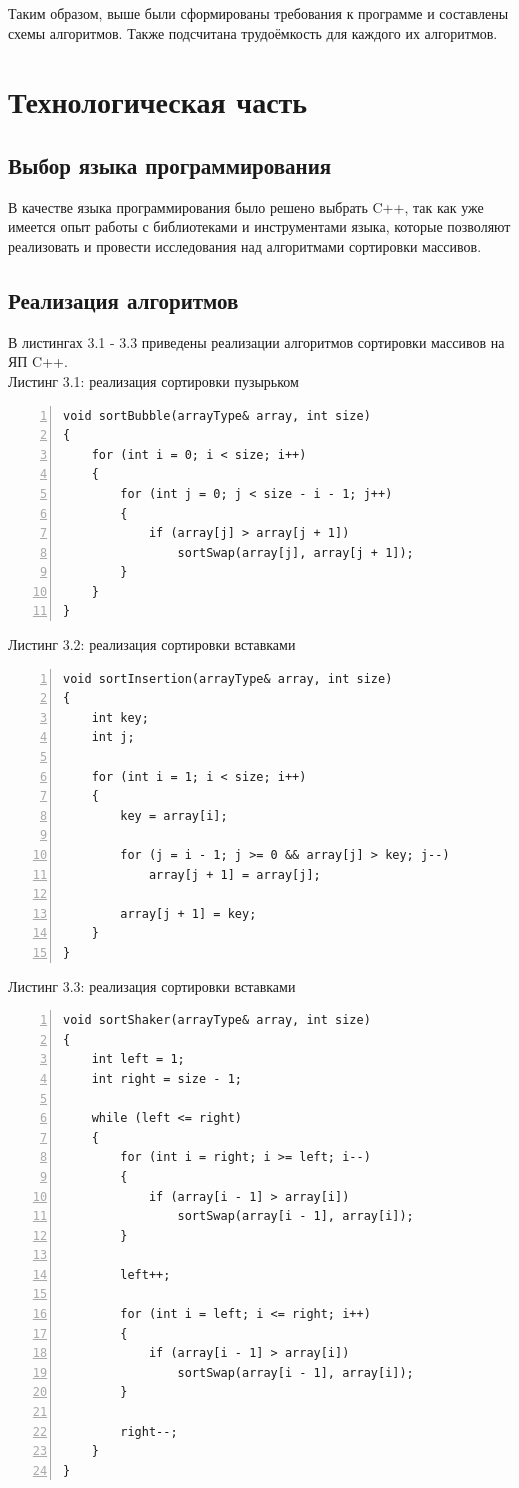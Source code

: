 \documentclass[12pt,a4paper]{report}
\begin{document}
Таким образом, выше были сформированы требования к программе и составлены схемы алгоритмов.
Также подсчитана трудоёмкость для каждого их алгоритмов.

\newpage
\chapter{Технологическая часть}

\section{Выбор языка программирования}

В качестве языка программирования было решено выбрать C++, так как уже имеется опыт работы с библиотеками и 
инструментами языка, которые позволяют реализовать и провести исследования над алгоритмами сортировки массивов.

\section{Реализация алгоритмов}

В листингах 3.1 - 3.3 приведены реализации алгоритмов сортировки массивов на ЯП C++. \\

\textrm{Листинг 3.1: реализация сортировки пузырьком}
\begin{lstlisting}[frame=single, numbers=left]
void sortBubble(arrayType& array, int size)
{
    for (int i = 0; i < size; i++)
    {
        for (int j = 0; j < size - i - 1; j++)
        {
            if (array[j] > array[j + 1])
                sortSwap(array[j], array[j + 1]);
        }
    }
}
\end{lstlisting}

\textrm{Листинг 3.2: реализация сортировки вставками}
\begin{lstlisting}[frame=single, numbers=left]
void sortInsertion(arrayType& array, int size)
{
    int key;
    int j;
    
    for (int i = 1; i < size; i++)
    {
        key = array[i];
    
        for (j = i - 1; j >= 0 && array[j] > key; j--)
            array[j + 1] = array[j];
    
        array[j + 1] = key;
    }
}
\end{lstlisting}

\textrm{Листинг 3.3: реализация сортировки вставками}
\begin{lstlisting}[frame=single, numbers=left]
void sortShaker(arrayType& array, int size)
{
    int left = 1;
    int right = size - 1;
    
    while (left <= right)
    {
        for (int i = right; i >= left; i--)
        {
            if (array[i - 1] > array[i])
                sortSwap(array[i - 1], array[i]);
        }
    
        left++;
    
        for (int i = left; i <= right; i++)
        {
            if (array[i - 1] > array[i])
                sortSwap(array[i - 1], array[i]);
        }
    
        right--;
    }
}
\end{lstlisting}
\end{document}
